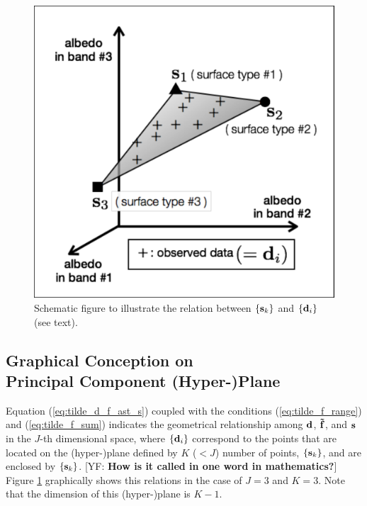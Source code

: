 \documentclass[iop,numberedappendix,apj,]{emulateapj}
\def\fast{\tilde f}
\def\memoYF#1{\color{red}[YF: {\bf #1}]\color{black}}
\begin{document}


\begin{figure}[b!]
    \begin{center}
\includegraphics[width=\hsize]{schematics.pdf}
    \end{center}
    \caption{Schematic figure to illustrate the relation between $\{{\bf s}_k\} $ and $\{{\bf d}_i\} $ (see text). }
\label{fig:schematic}
\end{figure}


\subsection{Graphical Conception on \\Principal Component (Hyper-)Plane}
\label{ss:PCplane}


Equation (\ref{eq:tilde_d_f_ast_s}) coupled with the conditions (\ref{eq:tilde_f_range}) and (\ref{eq:tilde_f_sum}) indicates the geometrical relationship among ${\bf d}$, ${\bf \fast }$, and ${\bf s}$ in the $J$-th dimensional space, where $\{{\bf d}_i\}$ correspond to the points that are located on the (hyper-)plane defined by $K$ ($<J$) number of points, $\{{\bf s}_k\} $, and are enclosed by $\{{\bf s}_k \}$. \memoYF{How is it called in one word in mathematics?}
Figure \ref{fig:schematic} graphically shows this relations in the case of $J=3$ and $K=3$. 
Note that the dimension of this (hyper-)plane is $K-1$.  
\end{document}

